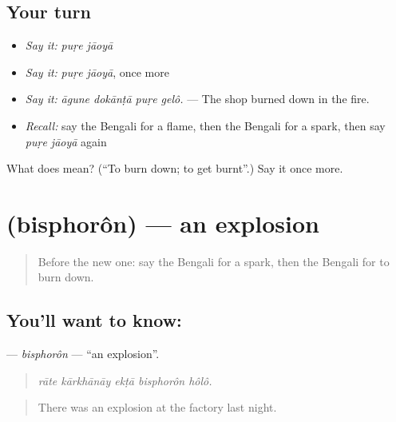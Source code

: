 \subsection*{Your turn}
\begin{itemize}
\raggedright
  \item \emph{Say it:} \emph{puṛe jāoyā}
  \item \emph{Say it:} \emph{puṛe jāoyā}, once more
  \item \emph{Say it:} \emph{āgune dokānṭā puṛe gelô.} — The shop burned down in the fire.
  \item \emph{Recall:} say the Bengali for a flame, then the Bengali for a spark, then say \emph{puṛe jāoyā} again
\end{itemize}

\begin{tcolorbox}[breakable,colback=teal!4,colframe=teal!35!black,title={Before you move on}]
What does   mean? (\textquotedblleft{}To burn down; to get burnt\textquotedblright{}.) Say it once more.
\end{tcolorbox}
\section[\texorpdfstring{\bn{বিস্ফোরণ} (bisphorôn)}{বিস্ফোরণ (bisphorôn)}]{ (bisphorôn) — an explosion}

\label{lesson:BN-C279-bisphoron}



\begin{quote}
Before the new one: say the Bengali for a spark, then the Bengali for to burn down.
\end{quote}

\subsection*{You'll want to know: }
\textbf{} — \emph{bisphorôn} — \textquotedblleft{}an explosion\textquotedblright{}.

\begin{quote}
    
\end{quote}

\begin{quote}
\emph{rāte kārkhānāy ekṭā bisphorôn hôlô.}
\end{quote}

\begin{quote}
There was an explosion at the factory last night.
\end{quote}

